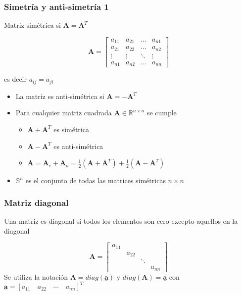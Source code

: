 \documentclass{beamer}
\begin{document}
\begin{frame}
\frametitle{Simetría y anti-simetría 1}
Matriz simétrica si $\boldsymbol{A} =\boldsymbol{A}^T$
  
\begin{equation*}
\boldsymbol{A} = \begin{bmatrix} a_{11} &  a_{21} & \dots & a_{n1}\\ a_{21} &  a_{22} & \dots & a_{n2} \\ \vdots &  \vdots & \ddots & \vdots \\ a_{n1} &  a_{n2} & \dots & a_{nn} \end{bmatrix}
\end{equation*}

es decir $a_{ij}=a_{ji}$

\begin{itemize}
\item La matriz es anti-simétrica si  $\boldsymbol{A} =-\boldsymbol{A}^T$
\item Para  cualquier matriz cuadrada $\boldsymbol{A} \in \mathbb{R}^{n\times n}$ se cumple

\begin{itemize}
\item $\boldsymbol{A}+ \boldsymbol{A}^T$ es simétrica 
\item $\boldsymbol{A}- \boldsymbol{A}^T$ es anti-simétrica
\item $\boldsymbol{A}= \boldsymbol{A}_{e}+\boldsymbol{A}_{o}= \frac{1}{2}(\boldsymbol{A}+\boldsymbol{A}^T)+\frac{1}{2}(\boldsymbol{A}-\boldsymbol{A}^T)$
\end{itemize}
\item $\mathbb{S}^{n}$ es el conjunto de todas las matrices simétricas $n\times n$
\end{itemize}
\end{frame}
\begin{frame}
\frametitle{Matriz diagonal}
Una matriz es diagonal si todos los elementos son cero excepto aquellos en la diagonal 
  
\begin{equation*}
\boldsymbol{A} = \begin{bmatrix} a_{11} &   &   &  \\   &  a_{22} &   &   \\  &    & \ddots &   \\   &   &  & a_{nn} \end{bmatrix}
\end{equation*}
Se utiliza la notación $\boldsymbol{A} = diag(\underline{\boldsymbol{a}})$ y $diag(\boldsymbol{A})=\underline{\boldsymbol{a}}$ con $\underline{\boldsymbol{a}}= {[a_{11}\hspace{1em} a_{22} \hspace{1em} \cdots \hspace{1em} a_{nn} ]}^T$
\end{frame}
\end{document}
